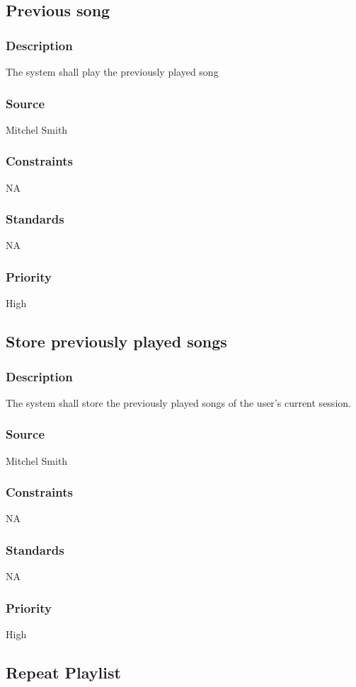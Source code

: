 \subsection{Previous song}
\subsubsection{Description}
The system shall play the previously played song
\subsubsection{Source}
Mitchel Smith
\subsubsection{Constraints}
NA
\subsubsection{Standards}
NA
\subsubsection{Priority}
High




\subsection{Store previously played songs}
\subsubsection{Description}
The system shall store the previously played songs of the user's current session.
\subsubsection{Source}
Mitchel Smith
\subsubsection{Constraints}
NA
\subsubsection{Standards}
NA
\subsubsection{Priority}
High

\subsection{Repeat Playlist}
